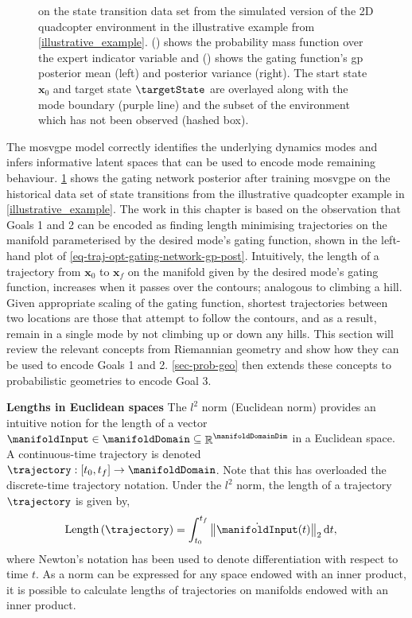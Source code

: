 \documentclass{mimosis-class/mimosis}
\numberwithin{equation}{chapter}
\DeclareMathOperator{\R}{\mathbb{R}}
\newcommand{\state}{\ensuremath{\mathbf{x}}}
\begin{document}
{\begin{figure}[h!]
{on the state transition data set from the simulated version of the 2D quadcopter environment
in the illustrative example from \cref{illustrative_example}.
() shows the probability mass function over the expert indicator
variable and () shows the gating function's \acrshort{gp}
posterior mean (left) and posterior variance (right).
The start state $\state_0$ and target state $\targetState$ are overlayed along with the mode boundary (purple line)
and the subset of the environment which has not been observed (hashed box).}
\label{fig-traj-opt-gating-network-gp}
\end{figure}
The \acrshort{mosvgpe} model correctly identifies the underlying dynamics modes and infers informative
latent spaces that can be used to encode mode remaining behaviour.
\cref{fig-traj-opt-gating-network-gp} shows the gating network posterior after training
\acrshort{mosvgpe} on the historical data set of state transitions from the illustrative quadcopter
example in \cref{illustrative_example}.
The work in this chapter is based on the observation that
Goals 1 and 2 can be encoded as finding length minimising trajectories on the manifold parameterised by the
desired mode's gating function, shown in the left-hand plot of \cref{eq-traj-opt-gating-network-gp-post}.
Intuitively, the length of a trajectory from \(\mathbf{x}_0\) to \(\mathbf{x}_f\) on the
manifold given by the desired mode's gating function,
increases when it passes over the contours; analogous to climbing a hill.
Given appropriate scaling of the gating function, shortest trajectories between two locations are
those that attempt to follow the contours, and as a result,
remain in a single mode by not climbing up or down any hills.
This section will review the relevant concepts from Riemannian geometry and show how they can be used
to encode Goals 1 and 2.
\cref{sec-prob-geo} then extends these concepts to probabilistic geometries to encode Goal 3.

\newline
\textbf{Lengths in Euclidean spaces}
The \(l^2\) norm (Euclidean norm) provides an intuitive notion for the length of a
vector \(\manifoldInput \in \manifoldDomain \subseteq \R^{\manifoldDomainDim}\) in a Euclidean space.
A continuous-time trajectory is denoted \(\trajectory: [t_0, t_f] \rightarrow \manifoldDomain\).
Note that this has overloaded the discrete-time trajectory notation.
Under the \(l^2\) norm, the length of a trajectory \(\trajectory\) is given by,
\begin{align} \label{eq-euclidean-length}
\text{Length}\left(\trajectory\right)
&= \int_{t_0}^{t_f}\left\|\dot{\manifoldInput}(t)\right\|_2 \mathrm{d}t,
\end{align}
where Newton's notation has been used to denote differentiation with respect to time \(t\).
As a norm can be expressed for any space endowed with an inner product, it is possible to
calculate lengths of trajectories on manifolds endowed with an inner product.

}
\end{document}
